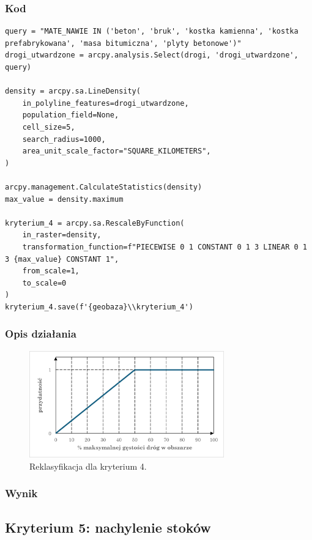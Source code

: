 \documentclass{article}
\begin{document}
\subsubsection{Kod}
\begin{lstlisting}
query = "MATE_NAWIE IN ('beton', 'bruk', 'kostka kamienna', 'kostka prefabrykowana', 'masa bitumiczna', 'plyty betonowe')"
drogi_utwardzone = arcpy.analysis.Select(drogi, 'drogi_utwardzone', query)

density = arcpy.sa.LineDensity(
    in_polyline_features=drogi_utwardzone,
    population_field=None,
    cell_size=5,
    search_radius=1000,
    area_unit_scale_factor="SQUARE_KILOMETERS",
)

arcpy.management.CalculateStatistics(density)
max_value = density.maximum

kryterium_4 = arcpy.sa.RescaleByFunction(
    in_raster=density,
    transformation_function=f"PIECEWISE 0 1 CONSTANT 0 1 3 LINEAR 0 1 3 {max_value} CONSTANT 1",
    from_scale=1,
    to_scale=0   
)
kryterium_4.save(f'{geobaza}\\kryterium_4')
\end{lstlisting}

\subsubsection{Opis działania}
\begin{figure}[H]
    \centering
    \includegraphics[width=0.75\textwidth]{img/kryterium4-wykres-glowny.png}
    \caption*{Reklasyfikacja dla kryterium 4.}
\end{figure}

\subsubsection{Wynik}
\newpage
\subsection{Kryterium 5: nachylenie stoków}
\end{document}
